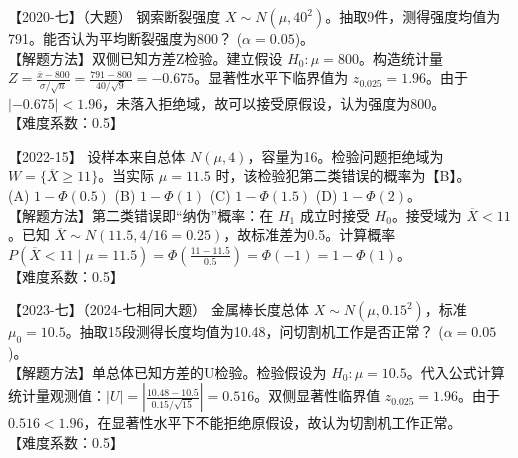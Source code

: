 \documentclass[zihao=4, a4paper, fontset=mac]{ctexart}
\begin{document}
\par\vspace{\baselineskip}

【2020-七】（大题） 钢索断裂强度 $X\sim N(\mu,40^2)$。抽取9件，测得强度均值为791。能否认为平均断裂强度为800？ ($\alpha=0.05$)。\\
【解题方法】双侧已知方差Z检验。建立假设 $H_0:\mu=800$。构造统计量 $Z=\frac{\overline{x}-800}{\sigma/\sqrt{n}} = \frac{791-800}{40/\sqrt{9}} = -0.675$。显著性水平下临界值为 $z_{0.025}=1.96$。由于 $|-0.675|<1.96$，未落入拒绝域，故可以接受原假设，认为强度为800。\\
【难度系数：0.5】

\par\vspace{\baselineskip}

【2022-15】 设样本来自总体 $N(\mu,4)$，容量为16。检验问题拒绝域为 $W=\{\overline{X}\ge11\}$。当实际 $\mu=11.5$ 时，该检验犯第二类错误的概率为【B】。\\
(A) $1-\Phi(0.5)$ \quad (B) $1-\Phi(1)$ \quad (C) $1-\Phi(1.5)$ \quad (D) $1-\Phi(2)$。\\
【解题方法】第二类错误即“纳伪”概率：在 $H_1$ 成立时接受 $H_0$。接受域为 $\overline{X}<11$。已知 $\overline{X}\sim N(11.5, 4/16=0.25)$，故标准差为0.5。计算概率 $P(\overline{X}<11 \mid \mu=11.5) = \Phi(\frac{11-11.5}{0.5}) = \Phi(-1) = 1-\Phi(1)$。\\
【难度系数：0.5】

\par\vspace{\baselineskip}

【2023-七】（2024-七相同大题） 金属棒长度总体 $X\sim N(\mu,0.15^2)$，标准 $\mu_0=10.5$。抽取15段测得长度均值为10.48，问切割机工作是否正常？ ($\alpha=0.05$)。\\
【解题方法】单总体已知方差的U检验。检验假设为 $H_0:\mu=10.5$。代入公式计算统计量观测值：$|U|=|\frac{10.48-10.5}{0.15/\sqrt{15}}|=0.516$。双侧显著性临界值 $z_{0.025}=1.96$。由于 $0.516<1.96$，在显著性水平下不能拒绝原假设，故认为切割机工作正常。\\
【难度系数：0.5】
\end{document}
